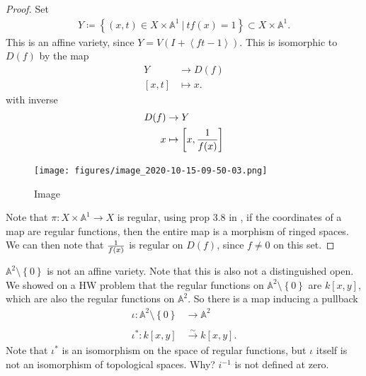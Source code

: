 \begin{proof}

Set
\begin{align*}  
Y \coloneqq\left\{{(x, t) \in X\times{\mathbb{A}}^1 {~\mathrel{\Big|}~}tf(x) = 1}\right\} \subset X\times{\mathbb{A}}^1
.\end{align*}
This is an affine variety, since
\(Y = V(I + \left\langle{ft-1}\right\rangle)\). This is isomorphic to
\(D(f)\) by the map
\begin{align*}  
Y &\to D(f) \\
{\left[ {x, t} \right]} &\mapsto x
.\end{align*}
with inverse
\begin{align*}
D(f)  &\to Y \\
x     &\mapsto {\left[ {x, {1\over f(x)} } \right]}
\end{align*}

\begin{figure}
\centering
\texttt{[image: figures/image\_2020-10-15-09-50-03.png]}
\caption{Image}
\end{figure}

Note that \(\pi: X\times{\mathbb{A}}^1 \to X\) is regular, using prop
3.8 in \autocite{AndreasGathmann515}, if the coordinates of a map are
regular functions, then the entire map is a morphism of ringed spaces.
We can then note that \(1\over f(x)\) is regular on \(D(f)\), since
\(f\neq 0\) on this set.

\end{proof}

\begin{example}

\({\mathbb{A}}^2 \setminus\left\{{0}\right\}\) is not an affine variety.
Note that this is also not a distinguished open. We showed on a HW
problem that the regular functions on
\({\mathbb{A}}^2\setminus\left\{{0}\right\}\) are \(k[x, y]\), which are
also the regular functions on \({\mathbb{A}}^2\). So there is a map
inducing a pullback
\begin{align*}  
\iota: {\mathbb{A}}^2\setminus\left\{{0}\right\}&\to {\mathbb{A}}^2 \\ \\
\iota^*: k[x, y]  &\xrightarrow{\sim} k[x, y]
.\end{align*}
Note that \(\iota^*\) is an isomorphism on the space of regular
functions, but \(\iota\) itself is not an isomorphism of topological
spaces. Why? \(i^{-1}\) is not defined at zero.

\end{example}

